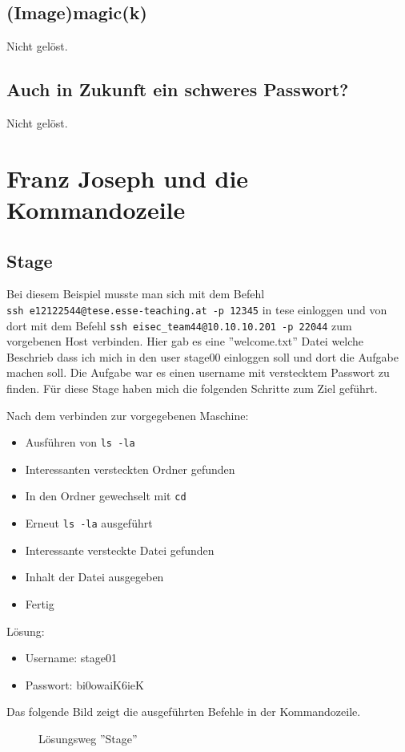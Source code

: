 \documentclass[12pt, a4paper, titlepage, oneside]{scrartcl}
\begin{document}
	\subsection{(Image)magic(k)}
	Nicht gelöst.

	\subsection{Auch in Zukunft ein schweres Passwort?}
	Nicht gelöst.

	\section{Franz Joseph und die Kommandozeile}

	\subsection{Stage}
	Bei diesem Beispiel musste man sich mit dem Befehl \\ \lstinline{ssh e12122544@tese.esse-teaching.at -p 12345}
	in tese einloggen und von dort mit dem Befehl \lstinline{ssh eisec_team44@10.10.10.201 -p 22044}
	zum vorgebenen Host verbinden. Hier gab es eine ''welcome.txt'' Datei welche
	Beschrieb dass ich mich in den user stage00 einloggen soll und dort die
	Aufgabe machen soll. Die Aufgabe war es einen username mit verstecktem Passwort
	zu finden. Für diese Stage haben mich die folgenden Schritte zum Ziel geführt.

	Nach dem verbinden zur vorgegebenen Maschine:
	\begin{itemize}
		\item Ausführen von \lstinline{ls -la}

		\item Interessanten versteckten Ordner gefunden

		\item In den Ordner gewechselt mit \lstinline{cd}

		\item Erneut \lstinline{ls -la} ausgeführt

		\item Interessante versteckte Datei gefunden

		\item Inhalt der Datei ausgegeben

		\item Fertig
	\end{itemize}

	Lösung:
	\begin{itemize}
		\item Username: stage01

		\item Passwort: bi0owaiK6ieK
	\end{itemize}
	Das folgende Bild zeigt die ausgeführten Befehle in der Kommandozeile.
	\begin{figure}[h!]
		\centering
		\caption{Lösungsweg ''Stage''}
		\label{fig:stage_solution}
	\end{figure}
\end{document}
